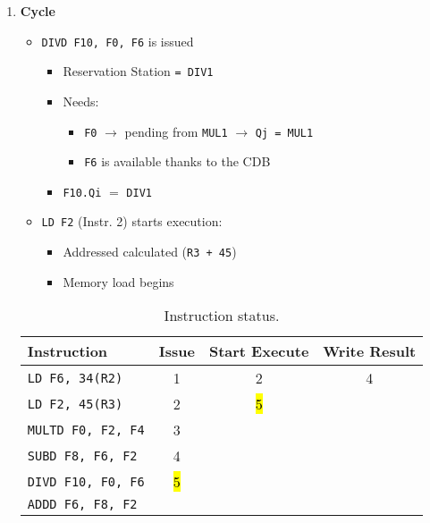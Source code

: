 \begin{enumerate}
    \item \textbf{Cycle \theenumi}
    \begin{itemize}
        \item \texttt{DIVD F10, F0, F6} is issued
        \begin{itemize}
            \item Reservation Station \texttt{= DIV1}
            \item Needs:
            \begin{itemize}
                \item \texttt{F0} $\rightarrow$ pending from \texttt{MUL1} $\rightarrow$ \texttt{Qj = MUL1}
                \item \texttt{F6} is available thanks to the CDB
            \end{itemize}
            \item \texttt{F10.Qi} $=$ \texttt{DIV1}
        \end{itemize}
        \item \texttt{LD F2} (Instr. 2) starts execution:
        \begin{itemize}
            \item Addressed calculated (\texttt{R3 + 45})
            \item Memory load begins
        \end{itemize}
    \end{itemize}

    \begin{table}[!htp]
        \centering
        \begin{tabular}{@{} l | c c c @{}}
            \toprule
            Instruction                 & Issue & Start Execute & Write Result  \\
            \midrule
            \texttt{LD    F6, 34(R2)}   & 1     & 2             & 4             \\ [.3em]
            \texttt{LD    F2, 45(R3)}   & 2     & \hl{5}        &               \\ [.3em]
            \texttt{MULTD F0, F2, F4}   & 3     &               &               \\ [.3em]
            \texttt{SUBD  F8, F6, F2}   & 4     &               &               \\ [.3em]
            \texttt{DIVD  F10, F0, F6}  & \hl{5}&               &               \\ [.3em]
            \texttt{ADDD  F6, F8, F2}   &       &               &               \\
            \bottomrule
        \end{tabular}
        \caption*{Instruction status.}
    \end{table}


\end{enumerate}
